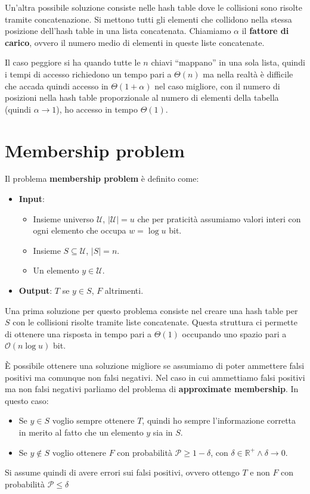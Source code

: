 Un'altra possibile soluzione consiste nelle hash table dove le collisioni sono
risolte tramite concatenazione. Si mettono tutti gli elementi che collidono nella
stessa posizione dell'hash table in una lista concatenata. Chiamiamo $\alpha$ il
\textbf{fattore di carico}, ovvero il numero medio di elementi in queste liste
concatenate.

Il caso peggiore si ha quando tutte le $n$ chiavi ``mappano'' in una sola lista,
quindi i tempi di accesso richiedono un tempo pari a $\Theta(n)$ ma nella realtà
è difficile che accada quindi accesso in $\Theta(1 + \alpha)$ nel caso migliore,
con il numero di posizioni nella hash table proporzionale al numero di elementi
della tabella (quindi $\alpha \to 1$), ho accesso in tempo $\Theta(1)$.
\section{Membership problem}
\begin{definizione}
    Il problema \textbf{membership problem} è definito come:
    \begin{itemize}
        \item \textbf{Input}:
              \begin{itemize}
                  \item Insieme universo $\mathcal{U}$, $|\mathcal{U}| = u$ che
                        per praticità assumiamo valori interi con ogni elemento
                        che occupa $w = \log u$ bit.
                  \item Insieme $S \subseteq \mathcal{U}$, $|S| = n$.
                  \item Un elemento $y \in \mathcal{U}$.
              \end{itemize}
        \item \textbf{Output}: $T$ se $y \in S$, $F$ altrimenti.
    \end{itemize}
\end{definizione}
Una prima soluzione per questo problema consiste nel creare una hash table per $S$
con le collisioni risolte tramite liste concatenate. Questa struttura ci permette
di ottenere una risposta in tempo pari a $\Theta(1)$ occupando uno spazio pari a
$\mathcal{O}(n \log u)$ bit.

È possibile ottenere una soluzione migliore se assumiamo di poter ammettere falsi
positivi ma comunque non falsi negativi. Nel caso in cui ammettiamo falsi positivi
ma non falsi negativi parliamo del problema di \textbf{approximate membership}.
In questo caso:
\begin{itemize}
    \item Se $y \in S$ voglio sempre ottenere $T$, quindi ho sempre l'informazione
          corretta in merito al fatto che un elemento $y$ sia in $S$.
    \item Se $y \notin S$ voglio ottenere $F$ con probabilità $\mathcal{P} \geq
              1 - \delta$, con $\delta \in \mathbb{R}^{+} \land \delta \to 0$.
\end{itemize}
Si assume quindi di avere errori sui falsi positivi, ovvero ottengo $T$ e non $F$
con probabilità $\mathcal{P} \leq \delta$

